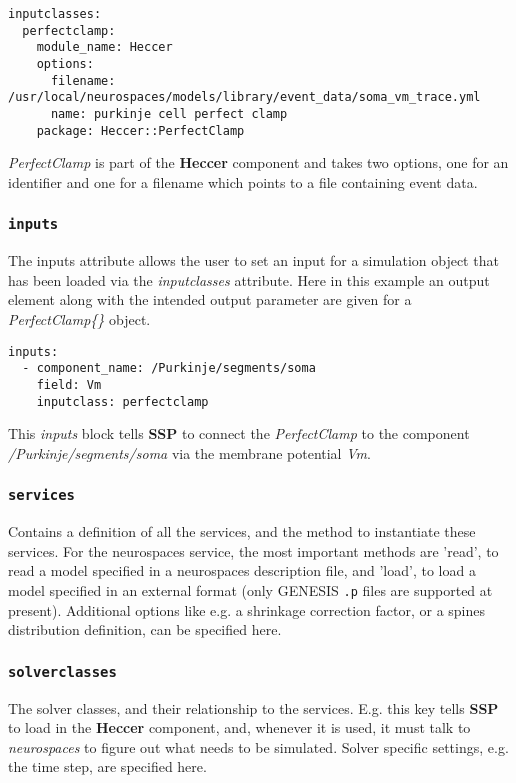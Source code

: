 \documentclass[12pt]{article}
\begin{document}
\begin{verbatim}
inputclasses:
  perfectclamp:
    module_name: Heccer
    options:
      filename: /usr/local/neurospaces/models/library/event_data/soma_vm_trace.yml
      name: purkinje cell perfect clamp
    package: Heccer::PerfectClamp
\end{verbatim}

{\it PerfectClamp} is part of the {\bf Heccer} component and takes two options, one for an identifier and one for a filename which points to a file containing event data.

\subsubsection*{\tt inputs}

The inputs attribute allows the user to set an input for a simulation object that has been loaded via the {\it inputclasses} attribute. Here in this example an output element along with the intended output parameter are given for a {\it PerfectClamp\{\}} object.

\begin{verbatim}
inputs:
  - component_name: /Purkinje/segments/soma
    field: Vm
    inputclass: perfectclamp
\end{verbatim}

This {\it inputs} block tells {\bf SSP} to connect the {\it PerfectClamp} to the component {\it /Purkinje/segments/soma}
 via the membrane potential {\it Vm}.

\subsubsection*{\tt services}

    Contains a definition of all the services, and the method to instantiate these services. For the neurospaces service, the most important methods are 'read', to read a model specified in a neurospaces description file, and 'load', to load a model specified in an external format (only GENESIS {\tt .p} files are supported at present). Additional options like e.g. a shrinkage correction factor, or a spines distribution definition, can be specified here. 

\subsubsection*{\tt solverclasses}

    The solver classes, and their relationship to the services. E.g. this key tells {\bf SSP} to load in the {\bf Heccer} component, and, whenever it is used, it must talk to {\it neurospaces} to figure out what needs to be simulated. Solver specific settings, e.g. the time step, are specified here. 
\end{document}
